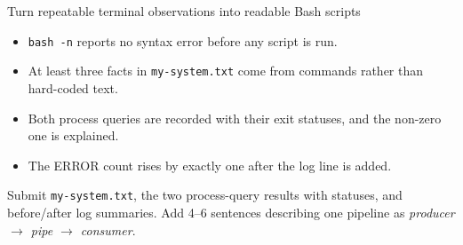 \begin{labproject}{Turn repeatable terminal observations into readable Bash scripts}
\begin{verification}
\begin{itemize}
  \item \texttt{bash -n} reports no syntax error before any script is run.
  \item At least three facts in \texttt{my-system.txt} come from commands rather than hard-coded text.
  \item Both process queries are recorded with their exit statuses, and the non-zero one is explained.
  \item The ERROR count rises by exactly one after the log line is added.
\end{itemize}
\end{verification}

\begin{labdeliverable}
Submit \texttt{my-system.txt}, the two process-query results with statuses, and before/after log summaries. Add 4--6 sentences describing one pipeline as \emph{producer $\rightarrow$ pipe $\rightarrow$ consumer}.
\end{labdeliverable}
\end{labproject}
